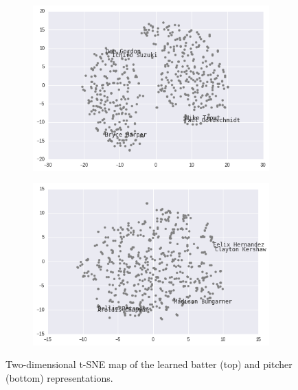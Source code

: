 \documentclass{article}
\begin{document}
\begin{figure}[h]
\captionsetup[subfigure]{labelformat=empty}
\centering

    \begin{subfigure}[b]{0.75\textwidth}
    \includegraphics[width=1\linewidth]{batter_tsne.png}
    \caption{}
    \end{subfigure}

    \begin{subfigure}[b]{0.75\textwidth}
    \includegraphics[width=1\linewidth]{pitcher_tsne.png}
    \caption{}
    \end{subfigure}

\caption{Two-dimensional t-SNE map of the learned batter (top) and pitcher (bottom) representations.}
\label{fig:tsne}
\end{figure}
\end{document}
